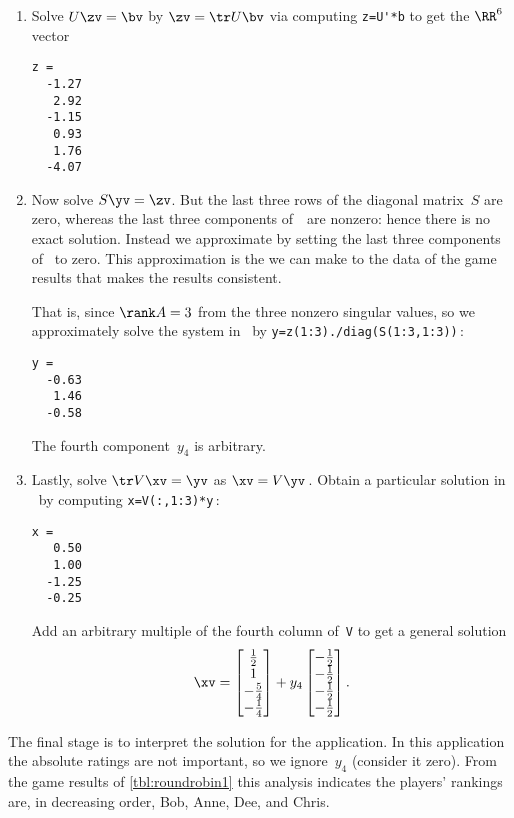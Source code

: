 \begin{example}
\begin{solution}
\begin{enumerate}
\item Solve \(U\zv=\bv\) by  \(\zv=\tr U\bv\) via computing \verb|z=U'*b| to get the \(\RR^6\) vector
\begin{verbatim}
z =
  -1.27
   2.92
  -1.15
   0.93
   1.76
  -4.07
\end{verbatim}

\item Now solve \(S\yv=\zv\).
But the last three rows of the diagonal matrix~\(S\) are zero, whereas the last three components of~\zv\ are nonzero: hence there is no exact solution. 
Instead we approximate by setting the last three components of \zv\ to zero.
This approximation is the \emph{} we can make to the data of the game results that makes the results consistent.

That is, since \(\rank A=3\) from the three nonzero singular values, so we approximately solve the system in \script\ by \verb|y=z(1:3)./diag(S(1:3,1:3))|\,:
\begin{verbatim}
y =
  -0.63
   1.46
  -0.58
\end{verbatim}
The fourth component~\(y_4\) is arbitrary.

\item Lastly, solve \(\tr V\xv=\yv\) as \(\xv=V\yv\)\,. 
Obtain a particular solution in \script\ by computing \verb|x=V(:,1:3)*y|\,:
\begin{verbatim}
x =
   0.50
   1.00
  -1.25
  -0.25
\end{verbatim}
Add an arbitrary multiple of the fourth column of~\verb|V| to get a general solution
\begin{equation*}
\xv=\begin{bmatrix} \frac12\\1\\-\frac54\\-\frac14 \end{bmatrix}
+y_4\begin{bmatrix} -\frac12\\ -\frac12\\ -\frac12\\ -\frac12 \end{bmatrix}.
\end{equation*}
\end{enumerate}
The final stage is to interpret the solution for the application.
In this application the absolute ratings are not important, so we ignore~\(y_4\) (consider it zero).  
From the game results of \autoref{tbl:roundrobin1} this analysis indicates the players' rankings are, in decreasing order, Bob, Anne, Dee, and Chris.
\end{solution}
\end{example}



